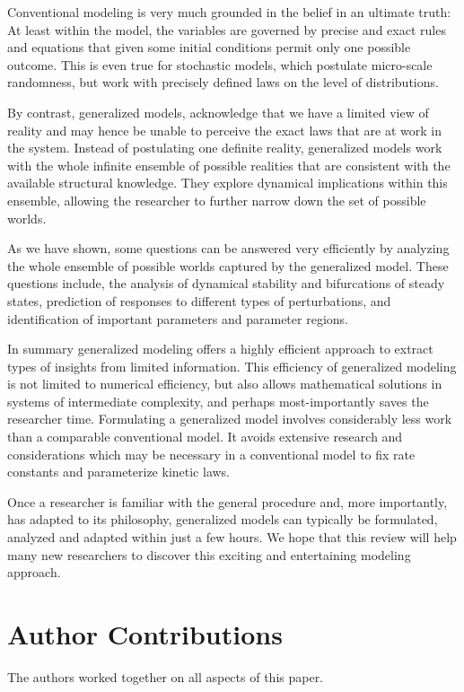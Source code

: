 \documentclass{article}
\begin{document}
Conventional modeling is very much grounded in the belief in an ultimate truth: At least within the model, the variables are governed by precise and exact rules and equations that given some initial conditions permit only one possible outcome. This is even true for stochastic models, which postulate micro-scale randomness, but work with precisely defined laws on the level of distributions. 

By contrast, generalized models, acknowledge that we have a limited view of reality and may hence be unable to perceive the exact laws that are at work in the system. Instead of postulating one definite reality, generalized models work with the whole infinite ensemble of possible realities that are consistent with the available structural knowledge. They explore dynamical implications within this ensemble, allowing the researcher to further narrow down the set of possible worlds. 

As we have shown, some questions can be answered very efficiently by analyzing the whole ensemble of possible worlds captured by the generalized model. These questions include, the analysis of dynamical stability and bifurcations of steady states, prediction of responses to different types of perturbations, and identification of important parameters and parameter regions. 

In summary generalized modeling offers a highly efficient approach to extract types of insights from limited information. This efficiency of generalized modeling is not limited to numerical efficiency, but also allows mathematical solutions in systems of intermediate complexity, and perhaps most-importantly saves the researcher time. Formulating a generalized model involves considerably less work than a comparable conventional model. It avoids extensive research and considerations which may be necessary in a conventional model to fix rate constants and parameterize kinetic laws.

Once a researcher is familiar with the general procedure and, more importantly, has adapted to its philosophy, generalized models can typically be formulated, analyzed and adapted within just a few hours. We hope that this review will help many new researchers to discover this exciting and entertaining modeling approach.  

\section*{Author Contributions}
The authors worked together on all aspects of this paper. 
\end{document}
